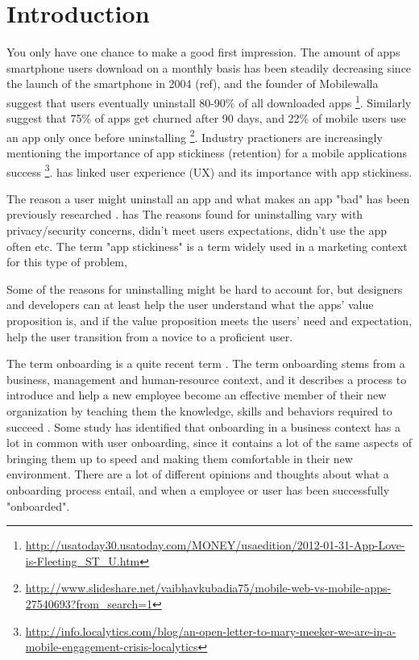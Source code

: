 \chapter{Introduction}
\label{chap:introduction}

You only have one chance to make a good first impression. The amount of apps smartphone users download on a monthly basis has been steadily decreasing since the launch of the smartphone in 2004 (ref), and the founder of Mobilewalla suggest that users eventually uninstall 80-90\% of all downloaded apps \footnote{\url{http://usatoday30.usatoday.com/MONEY/usaedition/2012-01-31-App-Love-is-Fleeting\_ST\_U.htm}}. Similarly \cite{Perro2016} suggest that 75\% of apps get churned after 90 days, and 22\% of mobile users use an app only once before uninstalling \footnote{\url{http://www.slideshare.net/vaibhavkubadia75/mobile-web-vs-mobile-apps-27540693?from_search=1}}. Industry practioners are increasingly mentioning the importance of app stickiness (retention) for a mobile applications success \cite{Perro2016} \cite{IGIGlobal2016} \footnote{\url{http://info.localytics.com/blog/an-open-letter-to-mary-meeker-we-are-in-a-mobile-engagement-crisis-localytics}}. \cite{IGIGlobal2016} has linked user experience (UX) and its importance with app stickiness.

The reason a user might uninstall an app and what makes an app "bad" has been previously researched \cite{Lin2012} \cite{Shklovski} \cite{Song2014}. \cite{IGIGlobal2016} has  The reasons found for uninstalling vary with privacy/security concerns, didn't meet users expectations, didn't use the app often etc. The term "app stickiness" is a term widely used in a marketing context for this type of problem,

Some of the reasons for uninstalling might be hard to account for, but designers and developers can at least help the user understand what the apps' value proposition is, and if the value proposition meets the users' need and expectation, help the user transition from a novice to a proficient user.

The term onboarding is a quite recent term \cite{Dai2007}. The term onboarding stems from a business, management and human-resource context, and it describes a process to introduce and help a new employee become an effective member of their new organization by teaching them the knowledge, skills and behaviors required to succeed \cite{Bauer2011}. Some study has identified that onboarding in a business context has a lot in common with user onboarding, since it contains a lot of the same aspects of bringing them up to speed and making them comfortable in their new environment. There are a lot of different opinions and thoughts about what a onboarding process entail, and when a employee or user has been successfully "onboarded".

